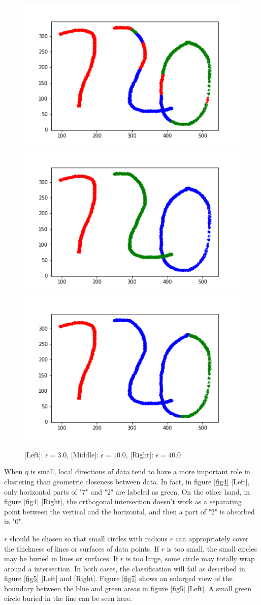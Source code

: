 \documentclass[11pt,reqno]{amsart}
\numberwithin{equation}{section}
\theoremstyle{plain}
\begin{document}
\begin{figure}[htbp]
\centering
\vspace{-1em}
\hspace{-2em}
\includegraphics[width=0.37  \textwidth]{eps_small.png}
\hspace{-2em}
\includegraphics[width=0.37  \textwidth]{normal_720.png}
\hspace{-2em}
\includegraphics[width=0.37  \textwidth]{eps_large.png}
\hspace{-2em}
\vspace{-1em}
\caption{[Left]: $\epsilon = 3.0$,  [Middle]: $\epsilon = 10.0$,  [Right]: $\epsilon = 40.0$}
\label{fig6}
\end{figure}


When $\eta$ is small, local directions of data tend to have a more important role in clustering than geometric closeness between data.
In fact, in figure \ref{fig4} [Left], only horizontal parts of "7" and "2" are labeled as green. On the other hand, in figure \ref{fig4} [Right], the orthogonal intersection doesn't work as a separating point between the vertical and the horizontal, and then a part of "2" is absorbed in "0".

$r$ should be chosen so that small circles with radious $r$ can appropriately cover the thickness of lines or surfaces of data points. If $r$ is too small, the small circles may be buried in lines or surfaces. If $r$ is too large, some circle may totally wrap around a intersection. In both cases, the classification will fail as described in figure \ref{fig5} [Left] and [Right]. Figure \ref{fig7} shows an enlarged view of the boundary between the blue and green areas in figure \ref{fig5} [Left]. A small green circle buried in the line can be seen here.
\end{document}
